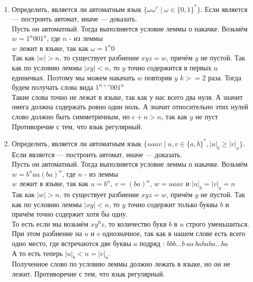 \documentclass[12pt]{article}
\begin{document}
\begin{enumerate}
  \item Определить, является ли автоматным язык $\{ \omega \omega^r \mid \omega \in \{ 0, 1 \}^* \}$. Если является --- построить автомат, иначе --- доказать.
  \\
  Пусть он автоматный. Тогда выполняется условие леммы о накачке. Возьмём $w = 1^n 0 0 1 ^ n$, где $n$ - из леммы \\
  $w$ лежит в языке, так как $\omega = 1^n 0$ \\
  Так как $|w| > n$, то существует разбиение $xyz = w$, причём $y$ не пустой. Так как по условию леммы $|xy| < n$, то $y$ точно содержится в первых n единичках. Поэтому мы можем накачать $w$ повторив $y$ $k >= 2$ раза. Тогда будем получать слова вида $1^{n+c}001^n$ \\
  Такие слова точно не лежат в языке, так как у нас всего два нуля. А значит омега должна содержать ровно один ноль. А значит относительно этих нулей слово должно быть симметричным, но $c + n > n$, так как $y$ не пуст \\
  Противоречие с тем, что язык регулярный.
  \\
  
  \item Определить, является ли автоматным язык $\{ u a a v \mid u, v \in \{ a, b \}^* , |u|_b \geq |v|_a \}$. Если является --- построить автомат, иначе --- доказать.
  \\
  Пусть он автоматный. Тогда выполняется условие леммы о накачке. Возьмём $w = b^n a a (b a) ^ n$, где $n$ - из леммы \\
  $w$ лежит в языке, так как $u = b^n , \ v = (ba)^n$, $w = uaav$ и $|u|_b = |v|_a = n$  \\
Так как $|w| > n$, то существует разбиение $xyz = w$, причём $y$ не пустой. Так как по условию леммы $|xy| < n$, то $y$ точно содержит только буквы $b$ и причём точно содержит хотя бы одну. \\
То есть если мы возьмём $xy^0z$, то количество букв $b$ в $u$ строго уменьшиться. При этом разбиение на $u$ и $v$ однозначное, так как в нашем слове есть всего одно место, где встречаются две буквы $a$ подряд : $bbb...b \ aa \ bababa...ba$ \\
А то есть теперь $|u|_b < n = |v|_a$. \\
Полученное слово по условию леммы должно лежать в языке, но он не лежит. Противоречие с тем, что язык регулярный.
  \\
\end{enumerate}

\newpage
\end{document}
